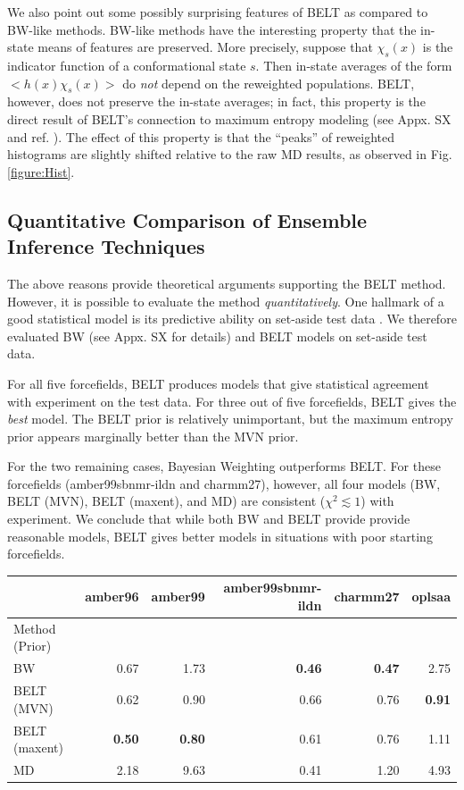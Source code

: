 \documentclass[journal=jacsat,manuscript=article]{achemso}
\begin{document}
We also point out some possibly surprising features of BELT as compared to BW-like methods.  BW-like methods have the interesting property that the in-state means of features are preserved.  More precisely, suppose that $\chi_s(x)$ is the indicator function of a conformational state $s$.  Then in-state averages of the form $<h(x) \chi_s(x)>$ do \emph{not} depend on the reweighted populations.  BELT, however, does not preserve the in-state averages; in fact, this property is the direct result of BELT's connection to maximum entropy modeling (see Appx. SX and ref. \cite{chodera2012}).  The effect of this property is that the ``peaks'' of reweighted histograms are slightly shifted relative to the raw MD results, as observed in Fig. \ref{figure:Hist}.  

\subsection{Quantitative Comparison of Ensemble Inference Techniques}

The above reasons provide theoretical arguments supporting the BELT method.  However, it is possible to evaluate the method \emph{quantitatively}.  One hallmark of a good statistical model is its predictive ability on set-aside test data \cite{friedman2001elements}.  We therefore evaluated BW (see Appx. SX for details) and BELT models on set-aside test data.  

For all five forcefields, BELT produces models that give statistical agreement with experiment on the test data.  For three out of five forcefields, BELT gives the \emph{best} model.  The BELT prior is relatively unimportant, but the maximum entropy prior appears marginally better than the MVN prior.  

For the two remaining cases, Bayesian Weighting outperforms BELT.  For these forcefields (amber99sbnmr-ildn and charmm27), however, all four models (BW, BELT (MVN), BELT (maxent), and MD) are consistent ($\chi^2 \lesssim 1$) with experiment.  We conclude that while both BW and BELT provide provide reasonable models, BELT gives better models in situations with poor starting forcefields.  

\begin{tabular}{lrrrrr}
\toprule
   &               amber96 &  amber99 &  amber99sbnmr-ildn &  charmm27 &  oplsaa \\
\midrule
Method (Prior)&          &          &                    &           &         \\
BW            &     0.67 &     1.73 &           \bf{0.46}&  \bf{0.47}&    2.75 \\
BELT  (MVN)   &     0.62 &     0.90 &               0.66 &      0.76 &\bf{0.91} \\
BELT  (maxent)&\bf{0.50} &\bf{0.80} &               0.61 &      0.76 &    1.11 \\
MD            &     2.18 &     9.63 &               0.41 &      1.20 &    4.93 \\
\bottomrule
\end{tabular}
\end{document}
